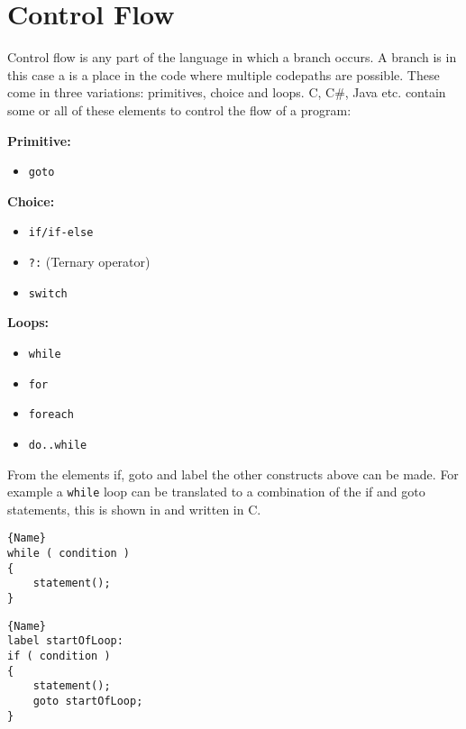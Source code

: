 \section{Control Flow}\label{subsec:control-flow}
Control flow is any part of the language in which a branch occurs. 
A branch is in this case a is a place in the code where multiple codepaths are possible. 
These come in three variations: primitives, choice and loops.
C, C\#, Java etc. contain some or all of these elements to control the flow of a program:

\textbf{Primitive:}
\begin{itemize}[noitemsep,topsep=-5pt] %
    \item \texttt{goto}
\end{itemize}

\textbf{Choice:}
\begin{itemize}[noitemsep,topsep=-5pt] %
    \item \texttt{if/if-else}
    \item \texttt{?:} (Ternary operator)
    \item \texttt{switch}
\end{itemize}

\textbf{Loops:}
\begin{itemize}[noitemsep,topsep=-5pt] %
    \item \texttt{while}
    \item \texttt{for}
    \item \texttt{foreach}
    \item \texttt{do..while}
\end{itemize}

From the elements if, goto and label the other constructs above can be made.
For example a \texttt{while} loop can be translated to a combination of the if and goto statements, this is shown in  and  written in C. 

\noindent\begin{minipage}{.45\textwidth}
\begin{lstlisting}[caption=Loop made with while.,frame=tlrb, label=ifgotowhile1, numbers=none]{Name}
while ( condition )
{
    statement();
}
\end{lstlisting}
\end{minipage}\hfill
\begin{minipage}{.45\textwidth}
\begin{lstlisting}[caption=The same loop with if and goto.,frame=tlrb, label=ifgotowhile2, numbers=none]{Name}
label startOfLoop:
if ( condition )
{
    statement();
    goto startOfLoop;
}
\end{lstlisting}
\end{minipage}

